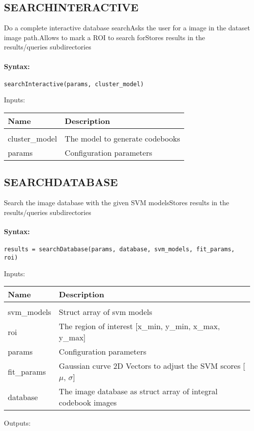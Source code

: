 \subsection{SEARCHINTERACTIVE}

Do a complete interactive database searchAsks the user for a image in the dataset image path.Allows to mark a ROI to search forStores results in the results/queries subdirectories

\paragraph{Syntax:} \verb|searchInteractive(params, cluster_model)|

Inputs:

\begin{tabular}{|l|p{5cm}|}
\hline
\textbf{Name} & \textbf{Description} \\
\hline \hline \\
cluster\_model & The model to generate codebooks  \\ \hline
params & Configuration parameters  \\ \hline
\end{tabular}

\subsection{SEARCHDATABASE}

Search the image database with the given SVM modelsStores results in the results/queries subdirectories

\paragraph{Syntax:} \verb|results = searchDatabase(params, database, svm_models, fit_params, roi)|

Inputs:

\begin{tabular}{|l|p{5cm}|}
\hline
\textbf{Name} & \textbf{Description} \\
\hline \hline \\
svm\_models & Struct array of svm models  \\ \hline
roi & The region of interest [x\_{min}, y\_{min}, x\_{max}, y\_{max}]  \\ \hline
params & Configuration parameters  \\ \hline
fit\_params & Gaussian curve 2D Vectors to adjust the SVM scores [$\mu$, $\sigma$]  \\ \hline
database & The image database as struct array of integral codebook images  \\ \hline
\end{tabular}
Outputs:

